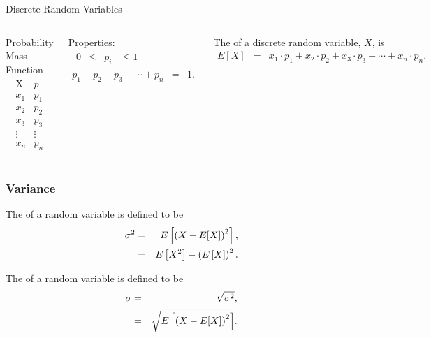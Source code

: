 \begin{frame}{Discrete Random Variables}

  \begin{columns}
    Probability Mass Function
    \begin{eqnarray*}
      \begin{array}{l|l}
        \mathrm{X} & p \\ \hline
        x_1 & p_1 \\
        x_2 & p_2 \\
        x_3 & p_3 \\
        \vdots & \vdots \\
        x_n & p_n
      \end{array}
    \end{eqnarray*}

    Properties:
    \begin{eqnarray*}
      \begin{array}{rcccl}
        0 & \leq & p_i & \leq 1
      \end{array}
      \\
      p_1 + p_2 + p_3 + \cdots + p_n & = & 1.
    \end{eqnarray*}

   The  of a discrete random variable, $X$, is
   \begin{eqnarray*}
     E[X] & = & x_1 \cdot p_1 + x_2 \cdot p_2 + x_3 \cdot p_3 + \cdots + x_n \cdot p_n.
   \end{eqnarray*}


  \end{columns}
  
\end{frame}



\begin{frame}
  \frametitle{Variance}

    \begin{definition}
      The  of a random variable is defined to be
      \begin{eqnarray*}
        \sigma^2 & = & E\left[\left( X - E[X] \right)^2\right], \\
        & = & E\left[X^2\right] - \left( E\left[X\right]\right)^2.
      \end{eqnarray*}
    \end{definition}

    \begin{definition}
      The  of a random variable is defined to be
      \begin{eqnarray*}
        \sigma   & = & \sqrt{\sigma^2}, \\
                 & = & \sqrt{E\left[\left( X - E[X] \right)^2\right]}.
      \end{eqnarray*}
    \end{definition}

\end{frame}


